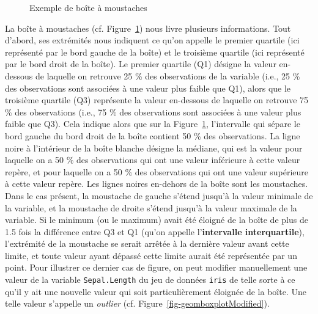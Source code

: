 \documentclass[
  letterpaper,
]{book}
\begin{document}
\begin{figure}[H]


\caption{\label{fig-geomboxplot}Exemple de boîte à moustaches}

\end{figure}%

La boîte à moustaches (cf. Figure~\ref{fig-geomboxplot}) nous livre
plusieurs informations. Tout d'abord, ses extrémités nous indiquent ce
qu'on appelle le premier quartile (ici représenté par le bord gauche de
la boîte) et le troisième quartile (ici représenté par le bord droit de
la boîte). Le premier quartile (Q1) désigne la valeur en-dessous de
laquelle on retrouve 25 \% des observations de la variable (i.e., 25 \%
des observations sont associées à une valeur plus faible que Q1), alors
que le troisième quartile (Q3) représente la valeur en-dessous de
laquelle on retrouve 75 \% des observations (i.e., 75 \% des
observations sont associées à une valeur plus faible que Q3). Cela
indique alors que sur la Figure~\ref{fig-geomboxplot}, l'intervalle qui
sépare le bord gauche du bord droit de la boîte contient 50 \% des
observations. La ligne noire à l'intérieur de la boîte blanche désigne
la médiane, qui est la valeur pour laquelle on a 50 \% des observations
qui ont une valeur inférieure à cette valeur repère, et pour laquelle on
a 50 \% des observations qui ont une valeur supérieure à cette valeur
repère. Les lignes noires en-dehors de la boîte sont les moustaches.
Dans le cas présent, la moustache de gauche s'étend jusqu'à la valeur
minimale de la variable, et la moustache de droite s'étend jusqu'à la
valeur maximale de la variable. Si le minimum (ou le maximum) avait été
éloigné de la boîte de plus de 1.5 fois la différence entre Q3 et Q1
(qu'on appelle l'\textbf{intervalle interquartile}), l'extrémité de la
moustache se serait arrêtée à la dernière valeur avant cette limite, et
toute valeur ayant dépassé cette limite aurait été représentée par un
point. Pour illustrer ce dernier cas de figure, on peut modifier
manuellement une valeur de la variable \texttt{Sepal.Length} du jeu de
données \texttt{iris} de telle sorte à ce qu'il y ait une nouvelle
valeur qui soit particulièrement éloignée de la boîte. Une telle valeur
s'appelle un \emph{outlier} (cf. Figure~\ref{fig-geomboxplotModified}).
\end{document}
